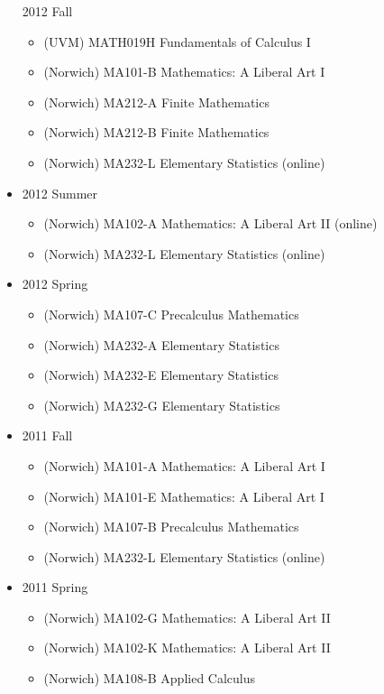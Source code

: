 \documentclass[a4paper]{adcv}
\begin{document}
\begin{itemize}
    2012 Fall
    \begin{itemize}
      \item (UVM) MATH019H Fundamentals of Calculus I
      \item (Norwich) MA101-B Mathematics: A Liberal Art I
      \item (Norwich) MA212-A Finite Mathematics
      \item (Norwich) MA212-B Finite Mathematics
      \item (Norwich) MA232-L Elementary Statistics (online)
    \end{itemize}
  \item
    2012 Summer
    \begin{itemize}
      \item (Norwich) MA102-A Mathematics: A Liberal Art II (online)
      \item (Norwich) MA232-L Elementary Statistics (online)
    \end{itemize}
  \item
    2012 Spring
    \begin{itemize}
      \item (Norwich) MA107-C Precalculus Mathematics
      \item (Norwich) MA232-A Elementary Statistics
      \item (Norwich) MA232-E Elementary Statistics
      \item (Norwich) MA232-G Elementary Statistics
    \end{itemize}
  \item
    2011 Fall
    \begin{itemize}
      \item (Norwich) MA101-A Mathematics: A Liberal Art I
      \item (Norwich) MA101-E Mathematics: A Liberal Art I
      \item (Norwich) MA107-B Precalculus Mathematics
      \item (Norwich) MA232-L Elementary Statistics (online)
    \end{itemize}
  \item
    2011 Spring
    \begin{itemize}
      \item (Norwich) MA102-G Mathematics: A Liberal Art II
      \item (Norwich) MA102-K Mathematics: A Liberal Art II
      \item (Norwich) MA108-B Applied Calculus
    \end{itemize}
\end{itemize}
\end{document}
